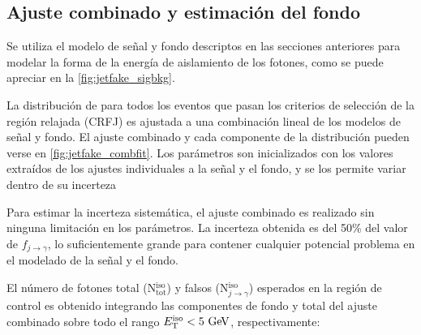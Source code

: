 
\subsection{Ajuste combinado y estimación del fondo} \label{sec:jet_fake_results}

Se utiliza el modelo de señal y fondo descriptos en las secciones anteriores para
modelar la forma de la energía de aislamiento de los fotones, como se puede
apreciar en la \cref{fig:jetfake_sigbkg}.

La distribución de {\etiso} para todos los eventos que pasan los criterios de
selección de la región relajada (CRFJ) es ajustada a una combinación lineal de
los modelos de señal y fondo. El ajuste combinado y cada componente de la
distribución pueden verse en \cref{fig:jetfake_combfit}. Los parámetros son
inicializados con los valores extraídos de los ajustes individuales a la señal y
el fondo, y se los permite variar dentro de su incerteza

Para estimar la incerteza sistemática, el ajuste combinado es realizado
sin ninguna limitación en los parámetros. La incerteza obtenida es del
50\% del valor de $f_{j\to\gamma}$, lo suficientemente grande para contener
cualquier potencial problema en el modelado de la señal y el fondo.


El número de fotones total (N$_\text{tot}^\text{iso}$) y falsos
(N$_{j\to\gamma}^\text{iso}$) esperados en la región de control es obtenido
integrando las componentes de fondo y total del ajuste combinado sobre todo el
rango $\etiso<5\gev$, respectivamente:


